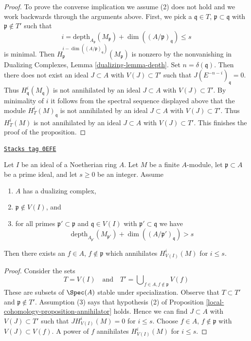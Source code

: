 \begin{proof}
\medskip\noindent
To prove the converse implication we assume (2) does not hold
and we work backwards through the arguments above. First, we pick a
$\mathfrak q \in T$, $\mathfrak p \subset \mathfrak q$
with $\mathfrak p \not \in T'$ such that
$$
i = \text{depth}_{A_\mathfrak p}(M_\mathfrak p) +
\dim((A/\mathfrak p)_\mathfrak q) \leq s
$$
is minimal. Then
$H^{i - \dim((A/\mathfrak p)_\mathfrak q)}_\mathfrak p(M_\mathfrak p)$
is nonzero by the nonvanishing in
Dualizing Complexes, Lemma \ref{dualizing-lemma-depth}.
Set $n = \delta(\mathfrak q)$. Then
there does not exist an ideal $J \subset A$ with $V(J) \subset T'$
such that $J(E^{-n - i})_\mathfrak q = 0$.
Thus $H^i_\mathfrak q(M_\mathfrak q)$ is not
annihilated by an ideal $J \subset A$ with $V(J) \subset T'$.
By minimality of $i$ it follows from the spectral sequence displayed above
that the module $H^i_T(M)_\mathfrak q$
is not annihilated by an ideal $J \subset A$
with $V(J) \subset T'$. Thus $H^i_T(M)$
is not annihilated by an ideal $J \subset A$
with $V(J) \subset T'$. This finishes the proof of the proposition.
\end{proof}

\begin{lemma}
\label{local-cohomology-lemma-kill-local-cohomology-at-prime}
\href{https://stacks.math.columbia.edu/tag/0EFE}{\texttt{Stacks tag 0EFE}}

Let $I$ be an ideal of a Noetherian ring $A$.
Let $M$ be a finite $A$-module, let $\mathfrak p \subset A$ be a prime
ideal, and let $s \geq 0$ be an integer. Assume
\begin{enumerate}
\item $A$ has a dualizing complex,
\item $\mathfrak p \not \in V(I)$, and
\item for all primes $\mathfrak p' \subset \mathfrak p$
and $\mathfrak q \in V(I)$ with $\mathfrak p' \subset \mathfrak q$ we have
$$
\text{depth}_{A_{\mathfrak p'}}(M_{\mathfrak p'}) +
\dim((A/\mathfrak p')_\mathfrak q) > s
$$
\end{enumerate}
Then there exists an $f \in A$, $f \not \in \mathfrak p$ which annihilates
$H^i_{V(I)}(M)$ for $i \leq s$.
\end{lemma}

\begin{proof}
Consider the sets
$$
T = V(I)
\quad\text{and}\quad
T' = \bigcup\nolimits_{f \in A, f \not \in \mathfrak p} V(f)
$$
These are subsets of $\Spec(A)$ stable under specialization.
Observe that $T \subset T'$ and $\mathfrak p \not \in T'$.
Assumption (3) says that hypothesis (2) of
Proposition \ref{local-cohomology-proposition-annihilator} holds.
Hence we can find $J \subset A$ with $V(J) \subset T'$
such that $J H^i_{V(I)}(M) = 0$ for $i \leq s$.
Choose $f \in A$, $f \not \in \mathfrak p$ with $V(J) \subset V(f)$.
A power of $f$ annihilates $H^i_{V(I)}(M)$ for $i \leq s$.
\end{proof}

